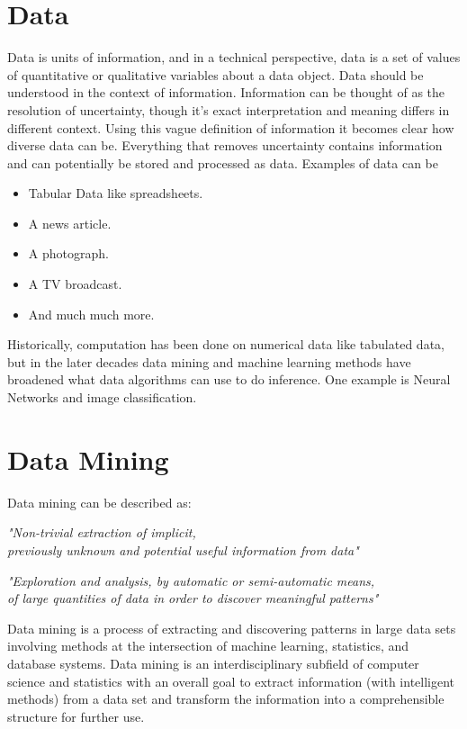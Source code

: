 \section{Data}
Data is units of information, and in a technical perspective, data is a set
of values of quantitative or qualitative variables about a data object. 
Data should be understood in the context of information. Information can be 
thought of as the resolution of uncertainty, though it's 
exact interpretation and meaning differs in different context. Using this
vague definition of information it becomes clear how diverse data can be.
Everything that removes uncertainty contains information and can potentially 
be stored and processed as data. Examples of data can be 

\begin{itemize}
    \item Tabular Data like spreadsheets.
    \item A news article.
    \item A photograph.
    \item A TV broadcast.
    \item And much much more.
\end{itemize}

Historically, computation has been done on numerical data like tabulated data,
but in the later decades data mining and machine learning methods have broadened
what data algorithms can use to do inference. One example is Neural Networks
and image classification.

\section{Data Mining}
Data mining can be described as:

\begin{center}
    \textit{"Non-trivial extraction of implicit, \\
    previously unknown and potential useful information from data"}
\end{center}

\begin{center}
    \textit{"Exploration and analysis, by automatic or semi-automatic means, \\
    of large quantities of data in order to discover meaningful patterns"}
\end{center}

Data mining is a process of extracting 
and discovering patterns in large data sets involving methods at the 
intersection of machine learning, statistics, and database systems. 
Data mining is an interdisciplinary subfield of computer science and statistics 
with an overall goal to extract information (with intelligent methods) 
from a data set and transform the information into a comprehensible structure 
for further use. \cite{enwiki:datamining}


